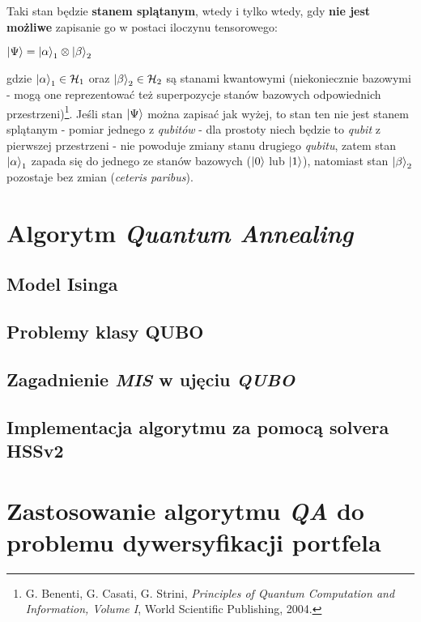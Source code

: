 \documentclass[12pt,a4paper,twoside,openany]{book}
\begin{document}
Taki stan będzie \textbf{stanem splątanym}, wtedy i tylko wtedy, gdy \textbf{nie jest możliwe} zapisanie go w postaci iloczynu tensorowego:
\begin{center}
    $\ket{\Psi} = \ket{\alpha}_1 \otimes \ket{\beta}_2$
\end{center}
gdzie $\ket{\alpha}_1 \in \mathcal{H}_1$ oraz $\ket{\beta}_2 \in \mathcal{H}_2$ są stanami kwantowymi (niekoniecznie bazowymi - mogą one reprezentować też superpozycje stanów bazowych odpowiednich przestrzeni)\footnote{G. Benenti, G. Casati, G. Strini, \textit{Principles of Quantum Computation
and Information, Volume I}, World Scientific Publishing, 2004.}.
Jeśli stan $\ket{\Psi}$ można zapisać jak wyżej, to stan ten nie jest stanem splątanym - pomiar jednego z \textit{qubitów} - dla prostoty niech będzie to \textit{qubit} z pierwszej przestrzeni - nie powoduje zmiany stanu drugiego \textit{qubitu}, zatem stan $\ket{\alpha}_1$ zapada się do jednego ze stanów bazowych ($\ket{0}$ lub $\ket{1}$), natomiast stan $\ket{\beta}_2$ pozostaje bez zmian (\textit{ceteris paribus}).




\chapter{Algorytm \textit{Quantum Annealing}}

\section{Model Isinga}

\section{Problemy klasy QUBO}

\section{Zagadnienie \textit{MIS} w ujęciu \textit{QUBO}}

\section{Implementacja algorytmu za pomocą solvera HSSv2}



\chapter{Zastosowanie algorytmu \textit{QA} do problemu dywersyfikacji portfela}
\end{document}
